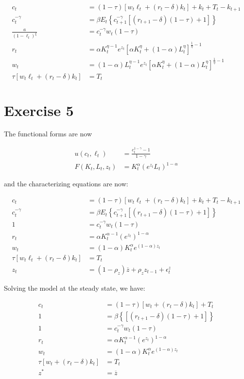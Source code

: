 \documentclass[11pt]{article}
\numberwithin{equation}{section}
\theoremstyle{plain}
\theoremstyle{definition}
\newcommand\parens[1]{\left( #1 \right)}
\newcommand{\1}{\mathbbm 1}
\def\a{\alpha}
\def\g{\gamma}
\begin{document}
\begin{align}
c_{t}&=(1-\tau)\left[w_{t} \ell_{t}+\left(r_{t}-\delta\right) k_{t}\right]+k_{t}+T_{t}-k_{t+1} \\
c_t^{-\g}&=\beta E_{t}\left\{c_{t+1}^{-\g}\left[\left(r_{t+1}-\delta\right)(1-\tau)+1\right]\right\} \\
\frac{a}{(1-\ell_t)^{\xi}}&=c_t^{-\g} w_{t}(1-\tau) \\
r_{t}&=\a K_{t}^{\eta - 1} e^{z_{t}} \left[\alpha K_{t}^{\eta}+(1-\alpha) L_{t}^{\eta}\right]^{\frac{1}{\eta} - 1} \\
w_{t}&=(1-\a) L_{t}^{\eta - 1} e^{z_{t}} \left[\alpha K_{t}^{\eta}+(1-\alpha) L_{t}^{\eta}\right]^{\frac{1}{\eta} - 1} \\
\tau\left[w_{t} \ell_{t}+\left(r_{t}-\delta\right) k_{t}\right]&=T_{t}
\end{align}


\section{Exercise 5}
The functional forms are now 

\begin{align} 
 u\left(c_{t}, \ell_{t}\right) &=\frac{c_{t}^{1-\gamma}-1}{1-\gamma} \\ 
 F\left(K_{t}, L_{t}, z_{t}\right) &= K_{t}^{\alpha} \parens{e^{z_{t}} L_{t}}^{1-\alpha} 
 \end{align}

and the characterizing equations are now:

\begin{align}
c_{t}&=(1-\tau)\left[w_{t} \ell_{t}+\left(r_{t}-\delta\right) k_{t}\right]+k_{t}+T_{t}-k_{t+1} \\
c_t^{-\g}&=\beta E_{t}\left\{c_{t+1}^{-\g}\left[\left(r_{t+1}-\delta\right)(1-\tau)+1\right]\right\} \\
1&=c_t^{-\g} w_{t}(1-\tau) \\
r_{t}&=\a K_{t}^{\alpha - 1} \parens{e^{z_{t}}}^{1-\alpha} \\
w_{t}&=(1-\a)K_{t}^{\alpha} e^{(1- \alpha) z_{t}} \\
\tau\left[w_{t} \ell_{t}+\left(r_{t}-\delta\right) k_{t}\right]&=T_t \\
z_{t}&=\left(1-\rho_{z}\right) \overline{z}+\rho_{z} z_{t-1}+
\epsilon_{t}^{z}
\end{align}


Solving the model at the steady state, we have:

\begin{align}
c_{t}&=(1-\tau)\left[w_{t}+\left(r_{t}-\delta\right) k_{t}\right]+T_{t} \\
1&=\beta \left\{\left[\left(r_{t+1}-\delta\right)(1-\tau)+1\right]\right\} \\
1&=c_t^{-\g} w_{t}(1-\tau) \\
r_{t}&=\a K_{t}^{\alpha - 1} \parens{e^{z_{t}}}^{1-\alpha} \\
w_{t}&=(1-\a)K_{t}^{\alpha} e^{(1- \alpha) z_{t}} \\
\tau\left[w_{t}+\left(r_{t}-\delta\right) k_{t}\right]&=T_t \\
z^{*}&=\overline{z}
\end{align}
\end{document}
